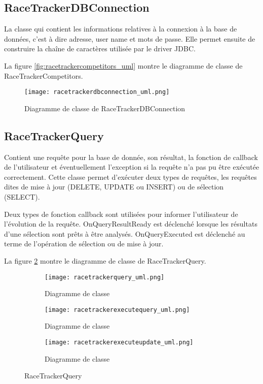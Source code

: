 \subsection{RaceTrackerDBConnection}

La classe qui contient les informations relatives à la connexion à la base de données, c'est à dire adresse, user name et mots de passe. Elle permet ensuite de construire la chaîne de caractères utilisée par le driver JDBC.

La figure \ref{fig:racetrackercompetitors_uml} montre le diagramme de classe de RaceTrackerCompetitors.

\begin{figure}[htb]
\centering 
\texttt{[image: racetrackerdbconnection\_uml.png]} 
\caption{Diagramme de classe de RaceTrackerDBConnection}
\label{fig:racetrackerdbconnection_uml}
 \end{figure}

\subsection{RaceTrackerQuery}

Contient une requête pour la base de donnée, son résultat, la fonction de callback de l'utilisateur et éventuellement l'exception si la requête n'a pas pu être exécutée correctement. Cette classe permet d'exécuter deux types de requêtes, les requêtes dites de mise à jour (DELETE, UPDATE ou INSERT) ou de sélection (SELECT).

Deux types de fonction callback sont utilisées pour informer l'utilisateur de l'évolution de la requête. OnQueryResultReady est déclenché lorsque les résultats d'une sélection sont prêts à être analysés. OnQueryExecuted est déclenché au terme de l'opération de sélection ou de mise à jour.

La figure \ref{fig:racetrackerquery_uml} montre le diagramme de classe de RaceTrackerQuery.

 \begin{figure}[htb]
    \centering
    \begin{subfigure}[htb]{1\textwidth}
		\texttt{[image: racetrackerquery\_uml.png]} 
		\caption{Diagramme de classe}
		\label{fig:racetrackerquery_uml}
    \end{subfigure}
    \begin{subfigure}[htb]{1\textwidth}
		\texttt{[image: racetrackerexecutequery\_uml.png]} 
		\caption{Diagramme de classe}
		\label{fig:racetrackerexecutequery_uml}
    \end{subfigure}
        \begin{subfigure}[htb]{1\textwidth}
		\texttt{[image: racetrackerexecuteupdate\_uml.png]} 
		\caption{Diagramme de classe}
		\label{fig:racetrackerexecuteupdate_uml}
    \end{subfigure}
    \caption{RaceTrackerQuery}\label{fig:racetrackerquery_fig}
\end{figure}

